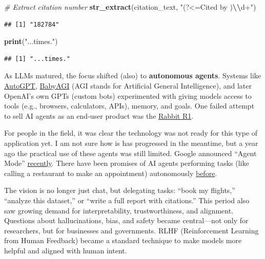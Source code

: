 \documentclass[
]{book}
\newenvironment{Shaded}{\begin{snugshade}}{\end{snugshade}}
\newcommand{\CommentTok}[1]{\textcolor[rgb]{0.56,0.35,0.01}{\textit{#1}}}
\newcommand{\FunctionTok}[1]{\textcolor[rgb]{0.13,0.29,0.53}{\textbf{#1}}}
\newcommand{\NormalTok}[1]{#1}
\newcommand{\SpecialCharTok}[1]{\textcolor[rgb]{0.81,0.36,0.00}{\textbf{#1}}}
\newcommand{\StringTok}[1]{\textcolor[rgb]{0.31,0.60,0.02}{#1}}
\begin{document}
\begin{Shaded}
\begin{Highlighting}[]
\CommentTok{\# Extract citation number}
\FunctionTok{str\_extract}\NormalTok{(citation\_text, }\StringTok{"(?\textless{}=Cited by )}\SpecialCharTok{\textbackslash{}\textbackslash{}}\StringTok{d+"}\NormalTok{)}
\end{Highlighting}
\end{Shaded}

\begin{verbatim}
## [1] "182784"
\end{verbatim}

\begin{Shaded}
\begin{Highlighting}[]
\FunctionTok{print}\NormalTok{(}\StringTok{"...times."}\NormalTok{)}
\end{Highlighting}
\end{Shaded}

\begin{verbatim}
## [1] "...times."
\end{verbatim}

As LLMs matured, the focus shifted (also) to \textbf{autonomous agents}.
Systems like \href{https://agpt.co/}{AutoGPT},
\href{https://babyagi.org/}{BabyAGI} (AGI stands for Artificial General Intelligence),
and later OpenAI's own GPTs (custom bots) experimented with
giving models access to tools (e.g., browsers, calculators, APIs), memory, and goals.
One failed attempt to sell AI agents as an end-user product was
the \href{https://www.youtube.com/watch?v=ddTV12hErTc&ab_channel=MarquesBrownlee}{Rabbit R1}.

For people in the field, it was clear the technology was not ready for this type of application yet.
I am not sure how is has progressed in the meantime, but a year ago the practical use of these
agents was still limited.
Google announced ``Agent Mode'' \href{https://www.youtube.com/watch?v=LxvErFkBXPk&ab_channel=Google}{recently}.
There have been promises of AI agents performing tasks
(like calling a restaurant to make an appointment) autonomously \href{https://www.youtube.com/watch?v=D5VN56jQMWM&ab_channel=JeffGrubb\%27sGameMess}{before}.

The vision is no longer just chat, but delegating tasks: ``book my flights,'' ``analyze this dataset,'' or
``write a full report with citations.''
This period also saw growing demand for interpretability, trustworthiness, and alignment.
Questions about hallucinations, bias, and safety became central---not only for researchers,
but for businesses and governments. RLHF (Reinforcement Learning from Human Feedback) became a
standard technique to make models more helpful and aligned with human intent.
\end{document}
